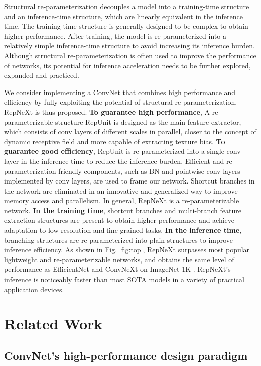 \documentclass[preprint,12pt]{elsarticle}
\begin{document}
Structural re-parameterization \cite{dbb} decouples a model into a training-time structure and an inference-time structure, which are linearly equivalent in the inference time. The training-time structure is generally designed to be complex to obtain higher performance. After training, the model is re-parameterized into a relatively simple inference-time structure to avoid increasing its inference burden. Although structural re-parameterization is often used to improve the performance of networks, its potential for inference acceleration needs to be further explored, expanded and practiced. 

We consider implementing a ConvNet that combines high performance and efficiency by fully exploiting the potential of structural re-parameterization. RepNeXt is thus proposed. \textbf{To guarantee high performance}, A re-parameterizable structure RepUnit is designed as the main feature extractor, which consists of conv layers of different scales in parallel, closer to the concept of dynamic receptive field \cite{vit} and more capable of extracting texture bias. \textbf{To guarantee good efficiency}, RepUnit is re-parameterized into a single conv layer in the inference time to reduce the inference burden. Efficient and re-parameterization-friendly components, such as BN and pointwise conv layers implemented by conv layers, are used to frame our network. Shortcut branches in the network are eliminated in an innovative and generalized way to improve memory access and parallelism. In general, RepNeXt is a re-parameterizable network. \textbf{In the training time}, shortcut branches and multi-branch feature extraction structures are present to obtain higher performance and achieve adaptation to low-resolution and fine-grained tasks. \textbf{In the inference time}, branching structures are re-parameterized into plain structures to improve inference efficiency. 
As shown in Fig. \ref{fig:top}, RepNeXt surpasses most popular lightweight and re-parameterizable networks, and obtains the same level of performance as EfficientNet and ConvNeXt on ImageNet-1K \cite{imagenet}. RepNeXt's inference is noticeably faster than most SOTA models in a variety of practical application devices.

\section{Related Work}
\label{sec:relatedwork}

\subsection{ConvNet's high-performance design paradigm}
\label{subsec:2-1}
 
\end{document}
